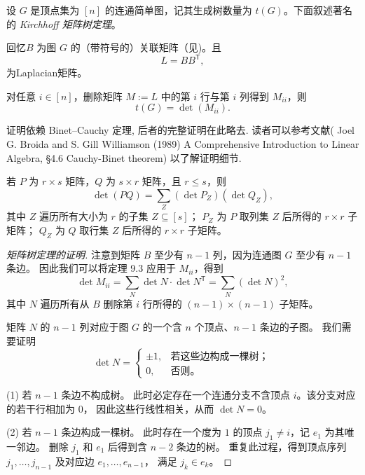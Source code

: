 \documentclass[lang=cn,newtx,10pt,scheme=chinese,chinesefont=nofont,citestyle=gb7714-2015, bibstyle=gb7714-2015]{elegantbook}
\begin{document}
\begin{refsection}
设 $G$ 是顶点集为 $[n]$ 的连通简单图，记其生成树数量为 $t(G)$。下面叙述著名的
\emph{Kirchhoff 矩阵树定理}。

回忆$B$ 为图 $G$ 的（带符号的）关联矩阵（见)。且
\[
L = B B^{\mathsf T},
\]
为Laplacian矩阵。

\begin{theorem}[矩阵树定理]\label{thm:matrix-tree}
对任意 $i\in[n]$，删除矩阵 $M:=L$ 中的第 $i$ 行与第 $i$ 列得到 $M_{ii}$，则
\[
t(G)=\det(M_{ii}).
\]
\end{theorem}

\begin{sloppypar}
证明依赖 Binet--Cauchy 定理, 后者的完整证明在此略去. 读者可以参考文献( Joel G. Broida and S. Gill Williamson (1989) A Comprehensive Introduction to Linear Algebra, §4.6 Cauchy-Binet theorem) 以了解证明细节.
\end{sloppypar}

\begin{theorem}\label{thm:binet-cauchy}
若 $P$ 为 $r\times s$ 矩阵，$Q$ 为 $s\times r$ 矩阵，且 $r\le s$，则
\[
\det(PQ)=\sum_{Z} (\det P_Z)(\det Q_Z),
\]
其中 $Z$ 遍历所有大小为 $r$ 的子集 $Z\subseteq [s]$；
$P_Z$ 为 $P$ 取列集 $Z$ 后所得的 $r\times r$ 子矩阵；
$Q_Z$ 为 $Q$ 取行集 $Z$ 后所得的 $r\times r$ 子矩阵。
\end{theorem}

\begin{proof}[ 矩阵树定理的证明]
注意到矩阵 $B$ 至少有 $n-1$ 列，因为连通图 $G$ 至少有 $n-1$ 条边。
因此我们可以将定理 9.3 应用于 $M_{ii}$，得到
\[
\det M_{ii}
  = \sum_{N} \det N \cdot \det N^{\mathsf T}
  = \sum_{N} (\det N)^2,
\]
其中 $N$ 遍历所有从 $B$ 删除第 $i$ 行所得的 $(n-1)\times(n-1)$ 子矩阵。

矩阵 $N$ 的 $n-1$ 列对应于图 $G$ 的一个含 $n$ 个顶点、$n-1$ 条边的子图。
我们需要证明
\[
\det N =
\begin{cases}
\pm 1, & \text{若这些边构成一棵树；}\\[4pt]
0,     & \text{否则。}
\end{cases}
\]

{(1) 若 $n-1$ 条边不构成树。}
此时必定存在一个连通分支不含顶点 $i$。该分支对应的若干行相加为 $0$，
因此这些行线性相关，从而 $\det N = 0$。

{(2) 若 $n-1$ 条边构成一棵树。}
此时存在一个度为 $1$ 的顶点 $j_1\neq i$，记 $e_1$ 为其唯一邻边。
删除 $j_1$ 和 $e_1$ 后得到含 $n-2$ 条边的树。
重复此过程，得到顶点序列 $j_1,\dots,j_{n-1}$ 及对应边 $e_1,\dots,e_{n-1}$，
满足 $j_k \in e_k$。


\end{proof}
\end{refsection}
\end{document}
